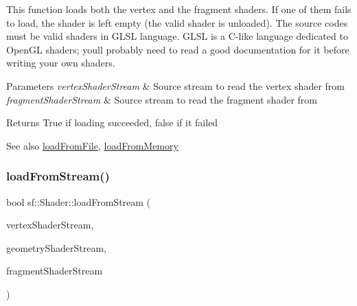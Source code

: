 This function loads both the vertex and the fragment shaders. If one of them fails to load, the shader is left empty (the valid shader is unloaded). The source codes must be valid shaders in G\+L\+SL language. G\+L\+SL is a C-\/like language dedicated to Open\+GL shaders; you\textquotesingle{}ll probably need to read a good documentation for it before writing your own shaders.


\begin{DoxyParams}{Parameters}
{\em vertex\+Shader\+Stream} & Source stream to read the vertex shader from \\
\hline
{\em fragment\+Shader\+Stream} & Source stream to read the fragment shader from\\
\hline
\end{DoxyParams}
\begin{DoxyReturn}{Returns}
True if loading succeeded, false if it failed
\end{DoxyReturn}
\begin{DoxySeeAlso}{See also}
\mbox{\hyperlink{classsf_1_1_shader_a053a5632848ebaca2fcd8ba29abe9e6e}{load\+From\+File}}, \mbox{\hyperlink{classsf_1_1_shader_ac92d46bf71dff2d791117e4e472148aa}{load\+From\+Memory}} \begin{DoxyVerb}\end{DoxyVerb}
 
\end{DoxySeeAlso}
\mbox{\label{classsf_1_1_shader_aa08f1c091806205e6654db9d83197fcd}} 
\subsubsection{\texorpdfstring{loadFromStream()}{loadFromStream()}\hspace{0.1cm}{\footnotesize\ttfamily [3/3]}}
{\footnotesize\ttfamily bool sf\+::\+Shader\+::load\+From\+Stream (\begin{DoxyParamCaption}\item[{\mbox{\hyperlink{classsf_1_1_input_stream}{Input\+Stream}} \&}]{vertex\+Shader\+Stream,  }\item[{\mbox{\hyperlink{classsf_1_1_input_stream}{Input\+Stream}} \&}]{geometry\+Shader\+Stream,  }\item[{\mbox{\hyperlink{classsf_1_1_input_stream}{Input\+Stream}} \&}]{fragment\+Shader\+Stream }\end{DoxyParamCaption})}



